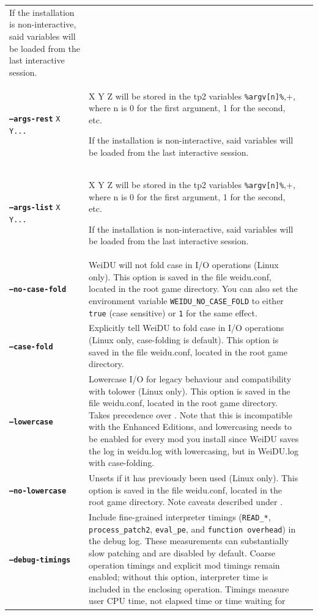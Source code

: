\documentclass{article}
\def\ttref#1{\ahrefloc{#1}{\tt #1}}
\def\DEFINE#1{{\tt \bf #1}\label{#1}\index{#1}}
\def\t#1{{\tt #1}}
\begin{document}
\begin{tabular}{lp{10in}|p{10in}}
If the installation is non-interactive, said variables will be loaded from the last interactive
session. \\
\DEFINE{--args-rest} \t{X Y...} & X Y Z will be stored in the tp2 variables \verb+%argv[n]%+,
where n is 0 for the first argument, 1 for the second, etc.

If the installation is non-interactive, said variables will be loaded from the last interactive
session. \\
\DEFINE{--args-list} \t{X Y...} & X Y Z will be stored in the tp2 variables \verb+%argv[n]%+,
where n is 0 for the first argument, 1 for the second, etc.

If the installation is non-interactive, said variables will be loaded from the last interactive
session. \\
\DEFINE{--no-case-fold} & WeiDU will not fold case in I/O operations
(Linux only). This option is saved in the file weidu.conf, located in
the root game directory. You can also set the environment variable
\t{WEIDU_NO_CASE_FOLD} to either \t{true} (case sensitive) or \t{1}
for the same effect. \\
\DEFINE{--case-fold} & Explicitly tell WeiDU to fold case in I/O
operations (Linux only, case-folding is default). This option is saved
in the file weidu.conf, located in the root game directory. \\
\DEFINE{--lowercase} & Lowercase I/O for legacy behaviour and
compatibility with tolower (Linux only). This option is saved in the
file weidu.conf, located in the root game directory. Takes precedence
over \ttref{--case-fold}. Note that this is incompatible with the
Enhanced Editions, and lowercasing needs to be enabled for every mod
you install since WeiDU saves the log in weidu.log with lowercasing,
but in WeiDU.log with case-folding. \\
\DEFINE{--no-lowercase} & Unsets \ttref{--lowercase} if it has
previously been used (Linux only). This option is saved in the file
weidu.conf, located in the root game directory. Note caveats described
under \ttref{--lowercase}. \\
\DEFINE{--debug-timings} & Include fine-grained interpreter timings
(\t{READ\_*}, \t{process\_patch2}, \t{eval\_pe}, and
\t{function overhead}) in the debug log. These measurements can
substantially slow patching and are disabled by default. Coarse
operation timings and explicit mod timings remain enabled; without
this option, interpreter time is included in the enclosing operation.
Timings measure user CPU time, not elapsed time or time waiting for

\end{tabular}
\end{document}
